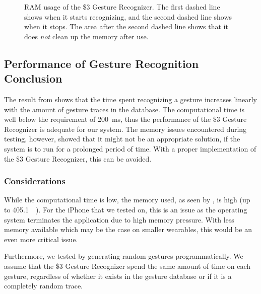 \begin{figure}[!htb]
  \caption{RAM usage of the \$3 Gesture Recognizer. The first dashed line shows when it starts recognizing, and the second dashed line shows when it stops. The area after the second dashed line shows that it does \emph{not} clean up the memory after use.}
  \label{fig:threedollarmemory}
\end{figure}

\subsection{Performance of Gesture Recognition Conclusion}
The result from  shows that the time spent recognizing a gesture 
increases linearly with the amount of gesture traces in the database.
The computational time is well below the requirement of \SI{200}{\milli\second},
thus the performance of the \$3 Gesture Recognizer is adequate for our system. 
The memory issues encountered during testing, however, 
showed that it might not be an appropriate solution, 
if the system is to run for a prolonged period of time.
With a proper implementation of the \$3 Gesture Recognizer, 
this can be avoided. 

\subsubsection{Considerations}
While the computational time is low, 
the memory used, as seen by , is high (up to \SI{405.1}{\mega\byte}). 
For the iPhone that we tested on, this is an issue as the operating system terminates the application due to high memory pressure. With less memory available which may be the case on smaller wearables, this would be an even more critical issue.

Furthermore, we tested by generating random gestures programmatically. 
We assume that the \$3 Gesture Recognizer spend the same amount of time on each gesture, 
regardless of whether it exists in the gesture database or if it is a completely random trace. 

